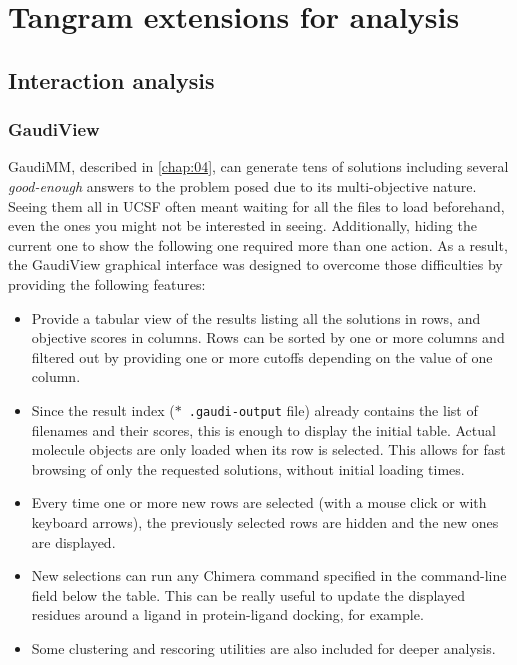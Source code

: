 
\chapter{Tangram extensions for analysis}
\label{appendix:more-tangram}

\section{Interaction analysis}
\subsection{GaudiView}
GaudiMM, described in \autoref{chap:04}, can generate tens of solutions including several \textit{good-enough} answers to the problem posed due to its multi-objective nature. Seeing them all in UCSF often meant waiting for all the files to load beforehand, even the ones you might not be interested in seeing. Additionally, hiding the current one to show the following one required more than one action. As a result, the GaudiView graphical interface was designed to overcome those difficulties by providing the following features:

\begin{itemize}
	\item Provide a tabular view of the results listing all the solutions in rows, and objective scores in columns. Rows can be sorted by one or more columns and filtered out by providing one or more cutoffs depending on the value of one column.

	\item Since the result index (\texttt{$\ast$ .gaudi-output} file) already contains the list of filenames and their scores, this is enough to display the initial table. Actual molecule objects are only loaded when its row is selected. This allows for fast browsing of only the requested solutions, without initial loading times.

	\item Every time one or more new rows are selected (with a mouse click or with keyboard arrows), the previously selected rows are hidden and the new ones are displayed.

	\item New selections can run any Chimera command specified in the command-line field below the table. This can be really useful to update the displayed residues around a ligand in protein-ligand docking, for example.

	\item Some clustering and rescoring utilities are also included for deeper analysis.
\end{itemize}


